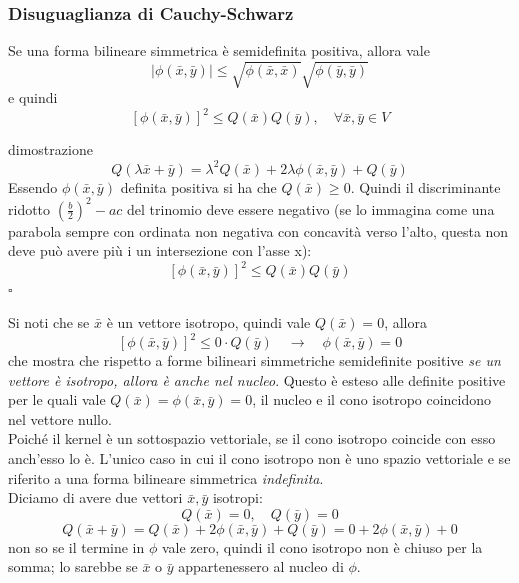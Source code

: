 \documentclass[x11names]{article}
\newcommand*{\QEDB}{\null\nobreak\hfill\ensuremath{\square}}%
\begin{document}
\begin{center}
	\colorbox{myred}{\begin{minipage}{5.75in}
			\begin{redes}{}
				\subsubsection{Disuguaglianza di Cauchy-Schwarz}
				Se una forma bilineare simmetrica è semidefinita positiva, allora vale
				\[
				| \phi(\bar{x},\bar{y}) | \leq \sqrt{\phi(\bar{x},\bar{x})} \sqrt{\phi(\bar{y},\bar{y})}
				\] 
				e quindi
				\[
				\left[\phi(\bar{x},\bar{y})\right]^2\leq Q(\bar{x})Q(\bar{y}), \quad \forall \bar{x},\bar{y} \in V
				\]
			\end{redes}
	\end{minipage}}        
\end{center}
\begin{es}{dimostrazione}
	\[
	Q(\lambda \bar{x}+\bar{y}) = \lambda^2Q(\bar{x}) + 2\lambda\phi(\bar{x},\bar{y}) + Q(\bar{y})
	\]
	Essendo $\phi(\bar{x},\bar{y})$ definita positiva si ha che $Q(\bar{x}) \geq 0$. Quindi il discriminante ridotto $\left(\frac{b}{2}\right)^2 -ac$ del trinomio deve essere negativo (se lo immagina come una parabola sempre con ordinata non negativa con concavità verso l'alto, questa non deve può avere più i un intersezione con l'asse x):
	\[
	\left[\phi(\bar{x},\bar{y})\right]^2\leq Q(\bar{x})Q(\bar{y})
	\] \QEDB
\end{es}
Si noti che se $\bar{x}$ è un vettore isotropo, quindi vale $Q(\bar{x}) = 0$, allora
\[
\left[\phi(\bar{x},\bar{y})\right]^2\leq 0\cdot Q(\bar{y}) \quad \to \quad \phi(\bar{x},\bar{y}) = 0
\]
che mostra che rispetto a forme bilineari simmetriche semidefinite positive \textit{se un vettore è isotropo, allora è anche nel nucleo}. Questo è esteso alle definite positive per le quali vale $Q(\bar{x}) = \phi(\bar{x},\bar{y}) = 0$, il nucleo e il cono isotropo coincidono nel vettore nullo. \\

\noindent
Poiché il kernel è un sottospazio vettoriale, se il cono isotropo coincide con esso anch'esso lo è. L'unico caso in cui il cono isotropo non è uno spazio vettoriale e se riferito a una forma bilineare simmetrica \textit{indefinita}.\\

\noindent
Diciamo di avere due vettori $\bar{x},\bar{y}$ isotropi:
\[
Q(\bar{x}) = 0, \quad Q(\bar{y}) = 0
\]
\[
Q(\bar{x} + \bar{y}) = Q(\bar{x}) + 2 \phi(\bar{x},\bar{y}) + Q(\bar{y}) = 0 + 2 \phi(\bar{x},\bar{y}) + 0
\]
non so se il termine in $\phi$ vale zero, quindi il cono isotropo non è chiuso per la somma; lo sarebbe se $\bar{x}$ o $\bar{y}$ appartenessero al nucleo di $\phi$.
\end{document}
